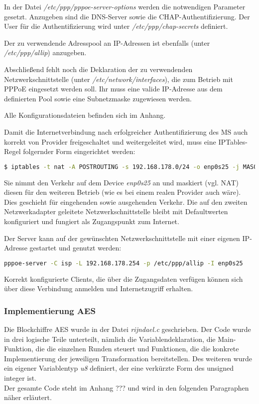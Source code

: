     	In der Datei \textit{/etc/ppp/pppoe-server-options} werden die notwendigen Parameter gesetzt. Anzugeben
    	sind die DNS-Server sowie die CHAP-Authentifizierung. Der User für die Authentifizierung
    	wird unter \textit{/etc/ppp/chap-secrets} definiert.

    	Der zu verwendende Adresspool an IP-Adressen ist ebenfalls (unter \textit{/etc/ppp/allip}) anzugeben.

    	Abschließend fehlt noch die Deklaration der zu verwendenden Netzwerkschnittstelle (unter \textit{/etc/network/interfaces}),
    	die zum Betrieb mit PPPoE eingesetzt werden soll. Ihr muss eine valide IP-Adresse aus dem definierten
    	Pool sowie eine Subnetzmaske zugewiesen werden.

    	Alle Konfigurationsdateien befinden sich im Anhang. %

    	Damit die Internetverbindung nach erfolgreicher Authentifizierung des \ac{MS} auch
    	korrekt von Provider freigeschaltet und weitergeleitet wird, muss eine IPTables-Regel
    	folgernder Form eingerichtet werden:

    	\begin{lstlisting}[language=bash]
		$ iptables -t nat -A POSTROUTING -s 192.168.178.0/24 -o enp0s25 -j MASQUERADE
	\end{lstlisting}

	Sie nimmt den Verkehr auf dem Device \textit{enp0s25} an und maskiert (vgl. \ac{NAT}) diesen
	für den weiteren Betrieb (wie es bei einem realen Provider auch wäre). Dies geschieht
	für eingehenden sowie ausgehenden Verkehr. Die auf den zweiten Netzwerkadapter geleitete
	Netzwerkschnittstelle bleibt mit Defaultwerten konfiguriert und fungiert als Zugangspunkt
	zum Internet.

	Der Server kann auf der gewünschten Netzwerkschnittstelle mit einer eigenen IP-Adresse
	gestartet und genutzt werden:
	\begin{lstlisting}[language=bash]
		pppoe-server -C isp -L 192.168.178.254 -p /etc/ppp/allip -I enp0s25
	\end{lstlisting}

        Korrekt konfigurierte Clients, die über die Zugangsdaten verfügen können sich über
        diese Verbindung anmelden und Internetzugriff erhalten.

	\subsubsection{Implementierung AES}
	\label{implementierung-aes}
	Die Blockchiffre AES wurde in der Datei \emph{rijndael.c} geschrieben. Der Code wurde in drei
	logische Teile unterteilt, nämlich die Variablen\-deklaration, die Main-Funktion, die die
	einzelnen Runden steuert und Funktionen, die die konkrete Implementierung der jeweiligen
	Transformation bereitstellen. Des weiteren wurde ein eigener Variablentyp \emph{u8} definiert,
	der eine verkürzte Form des unsigned integer ist. \\
	Der gesamte Code steht im Anhang ??? und wird in den folgenden Paragraphen näher erläutert.

